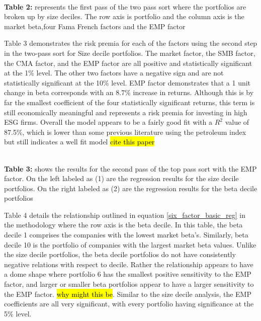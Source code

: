 \begin{center}
    \paperspacingnarrow
    \\
    \textbf{Table 2:} represents the first pass of the two pass sort where the portfolios are broken up by size deciles. The row axis is portfolio and the column axis is the  market beta,four Fama French factors and the EMP factor\\
    \paperspacingwide
\end{center}
Table 3 demonstrates the risk premia for each of the factors using the second step in the two-pass sort for Size decile portfolios. The market factor, the SMB factor, the CMA factor, and the EMP factor are all positive and statistically significant at the 1\% level. The other two factors have a negative sign and are not statistically significant at the 10\% level.  EMP factor demonstrates that a 1 unit change in beta corresponds with an 8.7\% increase in returns. Although this is by far the smallest coefficient of the four statistically significant returns, this term is still economically meaningful and represents a risk premia for investing in high ESG firms. Overall the model appears to be a fairly good fit with a $R^2$ value of 87.5\%, which is lower than some previous literature using the petroleum index but still indicates a well fit model \hl{cite this paper} 


\begin{center}
    \paperspacingnarrow
    \\
    \textbf{Table 3:} shows the results for the second pass of the top pass sort with the EMP factor. On the left labeled as (1) are the regression results for the size decile portfolios. On the right labeled as (2) are the regression results for the beta decile portfolios\\
    \paperspacingwide
\end{center}

Table 4 details the relationship outlined in equation \eqref{six_factor_basic_reg} in the methodology where the row axis is the beta decile. In this table,  the beta decile 1 comprises the companies with the lowest market beta's. Similarly, beta decile 10 is the portfolio of companies with the largest market beta values.  Unlike the size decile portfolios, the beta decile portfolios do not have consistently negative relations with respect to decile. Rather the relationship appears to have a dome shape where portfolio 6 has the smallest positive sensitivity to the EMP factor, and larger or smaller beta portfolios appear to have a larger sensitivity to the  EMP factor. \hl{why might this be}. Similar to the size decile analysis, the EMP coefficients are all very significant, with every portfolio having significance at the 5\% level. 

